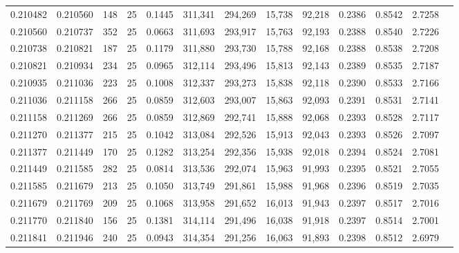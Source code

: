 \begin{tabular}{rrrrrrrrrrrrr}
0.210482 & 0.210560 &   148 &  25 &                                     0.1445 & 311,341 & 294,269 &  15,738 &  92,218 & 0.2386 & 0.8542 & 2.7258 \\
0.210560 & 0.210737 &   352 &  25 &                                     0.0663 & 311,693 & 293,917 &  15,763 &  92,193 & 0.2388 & 0.8540 & 2.7226 \\
0.210738 & 0.210821 &   187 &  25 &                                     0.1179 & 311,880 & 293,730 &  15,788 &  92,168 & 0.2388 & 0.8538 & 2.7208 \\
0.210821 & 0.210934 &   234 &  25 &                                     0.0965 & 312,114 & 293,496 &  15,813 &  92,143 & 0.2389 & 0.8535 & 2.7187 \\
0.210935 & 0.211036 &   223 &  25 &                                     0.1008 & 312,337 & 293,273 &  15,838 &  92,118 & 0.2390 & 0.8533 & 2.7166 \\
0.211036 & 0.211158 &   266 &  25 &                                     0.0859 & 312,603 & 293,007 &  15,863 &  92,093 & 0.2391 & 0.8531 & 2.7141 \\
0.211158 & 0.211269 &   266 &  25 &                                     0.0859 & 312,869 & 292,741 &  15,888 &  92,068 & 0.2393 & 0.8528 & 2.7117 \\
0.211270 & 0.211377 &   215 &  25 &                                     0.1042 & 313,084 & 292,526 &  15,913 &  92,043 & 0.2393 & 0.8526 & 2.7097 \\
0.211377 & 0.211449 &   170 &  25 &                                     0.1282 & 313,254 & 292,356 &  15,938 &  92,018 & 0.2394 & 0.8524 & 2.7081 \\
0.211449 & 0.211585 &   282 &  25 &                                     0.0814 & 313,536 & 292,074 &  15,963 &  91,993 & 0.2395 & 0.8521 & 2.7055 \\
0.211585 & 0.211679 &   213 &  25 &                                     0.1050 & 313,749 & 291,861 &  15,988 &  91,968 & 0.2396 & 0.8519 & 2.7035 \\
0.211679 & 0.211769 &   209 &  25 &                                     0.1068 & 313,958 & 291,652 &  16,013 &  91,943 & 0.2397 & 0.8517 & 2.7016 \\
0.211770 & 0.211840 &   156 &  25 &                                     0.1381 & 314,114 & 291,496 &  16,038 &  91,918 & 0.2397 & 0.8514 & 2.7001 \\
0.211841 & 0.211946 &   240 &  25 &                                     0.0943 & 314,354 & 291,256 &  16,063 &  91,893 & 0.2398 & 0.8512 & 2.6979 \\

\end{tabular}
